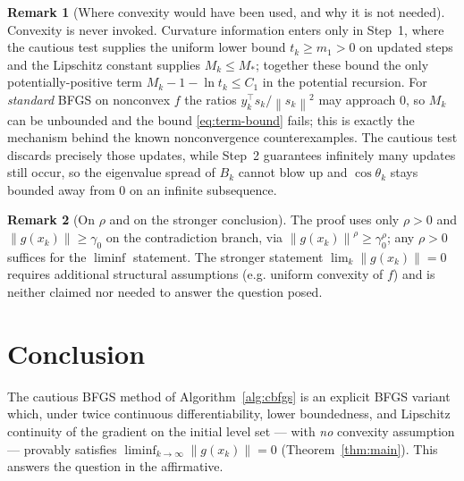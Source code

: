 \documentclass{amsart}
\theoremstyle{definition}
\newtheorem{remark}{Remark}
\newcommand{\norm}[1]{\left\lVert #1\right\rVert}
\begin{document}
\begin{remark}[Where convexity would have been used, and why it is not needed]
Convexity is never invoked. Curvature information enters only in Step~1, where
the cautious test supplies the uniform lower bound $t_k\ge m_1>0$ on updated
steps and the Lipschitz constant supplies $M_k\le M_*$; together these bound the
only potentially-positive term $M_k-1-\ln t_k\le C_1$ in the potential
recursion. For \emph{standard} BFGS on nonconvex $f$ the ratios
$y_k^\top s_k/\norm{s_k}^2$ may approach $0$, so $M_k$ can be unbounded and the
bound \eqref{eq:term-bound} fails; this is exactly the mechanism behind the known
nonconvergence counterexamples. The cautious test discards precisely those
updates, while Step~2 guarantees infinitely many updates still occur, so the
eigenvalue spread of $B_k$ cannot blow up and $\cos\theta_k$ stays bounded away
from $0$ on an infinite subsequence.
\end{remark}

\begin{remark}[On $\rho$ and on the stronger conclusion]
The proof uses only $\rho>0$ and $\norm{g(x_k)}\ge\gamma_0$ on the contradiction
branch, via $\norm{g(x_k)}^\rho\ge\gamma_0^\rho$; any $\rho>0$ suffices for the
$\liminf$ statement. The stronger statement $\lim_{k}\norm{g(x_k)}=0$ requires
additional structural assumptions (e.g. uniform convexity of $f$) and is neither
claimed nor needed to answer the question posed.
\end{remark}

\section*{Conclusion}

The cautious BFGS method of Algorithm~\ref{alg:cbfgs} is an explicit BFGS
variant which, under twice continuous differentiability, lower boundedness, and
Lipschitz continuity of the gradient on the initial level set --- with \emph{no}
convexity assumption --- provably satisfies
$\liminf_{k\to\infty}\norm{g(x_k)}=0$ (Theorem~\ref{thm:main}). This answers the
question in the affirmative.
\end{document}
